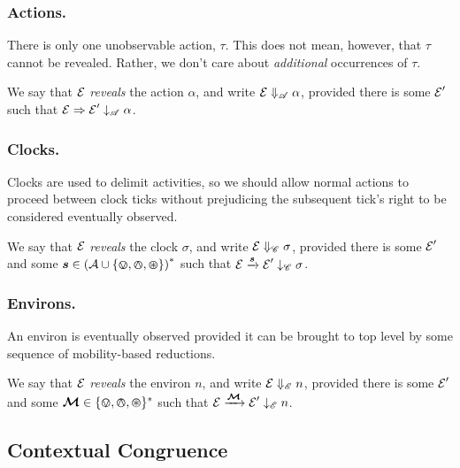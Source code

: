 \documentclass[orivec,envcountsame]{llncs}
\newcommand{\Exhibits}[1]{\mathrel{\downarrow_{#1}}}
\newcommand{\ExhibitsA}{\Exhibits{\mathscr{A}}}
\newcommand{\ExhibitsC}{\Exhibits{\mathscr{C}}}
\newcommand{\ExhibitsE}{\Exhibits{\mathscr{E}}}
\newcommand{\Reveals}[1]{\mathrel{\Downarrow_{#1}}}
\newcommand{\RevealsA}{\Reveals{\mathscr{A}}}
\newcommand{\RevealsC}{\Reveals{\mathscr{C}}}
\newcommand{\RevealsE}{\Reveals{\mathscr{E}}}
\newcommand{\Does}[1]{\xderives{#1}}
\newcommand{\DoesTaus}{\mathrel{\Rightarrow}}
\begin{document}
\subsubsection{Actions.}

There is only one unobservable action, $\tau$. This does not mean, however, that $\tau$ cannot be revealed. Rather, we don't care about \emph{additional} occurrences of $\tau$.

\begin{definition}
We say that $\text{$\mathcal{E}$}$ \emph{reveals} the action $\alpha$, and write $\expr \RevealsA \alpha$, provided there is some $\text{$\mathcal{E}$}'$ such that $\expr \DoesTaus \expr' \ExhibitsA \alpha$.
\end{definition}

\subsubsection{Clocks.}

Clocks are used to delimit activities, so we should allow normal actions to proceed between clock ticks without prejudicing the subsequent tick's right to be considered eventually observed.

\begin{definition}
We say that $\text{$\mathcal{E}$}$ \emph{reveals} the clock $\sigma$, and write $\expr \RevealsC \sigma$, provided there is some $\text{$\mathcal{E}$}'$ and some $\vec{s} \in \left( \act \cup \{ \tin, \tout, \topen \}\right)^*$ such that $\expr \Does{\vec{s}} \expr' \ExhibitsC \sigma$.
\end{definition}


\subsubsection{Environs.}

An environ is eventually observed provided it can be brought to top level by some sequence of mobility-based reductions.

\begin{definition}
We say that $\text{$\mathcal{E}$}$ \emph{reveals} the environ $n$, and write $\expr \RevealsE n$, provided there is some $\text{$\mathcal{E}$}'$ and some $\vec{\ambop} \in \{\tin, \tout, \topen\}^*$ such that $\expr \Does{\vec{\ambop}} \expr' \ExhibitsE n$.
\end{definition}



\subsection{Contextual Congruence}
\label{sec:contextual-congruence}
\end{document}

